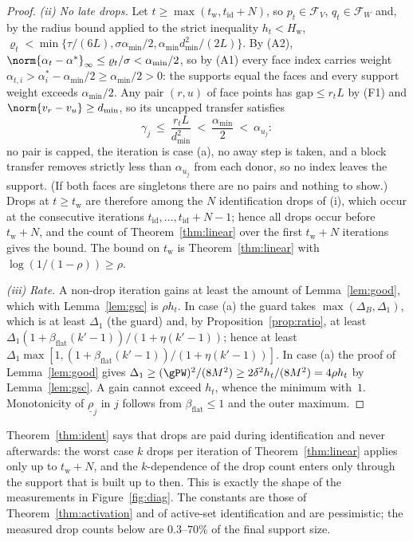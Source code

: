 \begin{proof}
\emph{(ii) No late drops.} Let $t\ge\max(t_{\mathrm w},t_{\mathrm{id}}+N)$,
so $p_t\in\mathcal F_V$, $q_t\in\mathcal F_W$ and, by the radius bound
applied to the strict inequality $h_t<H_{\mathrm w}$,
$\varrho_t<\min\{\tau/(6L),\sigma\alpha_{\min}/2,\alpha_{\min}d_{\min}^2/(2L)\}$.
By (A2), $\norm{\alpha_t-\alpha^*}_\infty\le \varrho_t/\sigma<\alpha_{\min}/2$,
so by (A1) every face index carries weight
$\alpha_{t,i}>\alpha^*_i-\alpha_{\min}/2\ge\alpha_{\min}/2>0$: the
supports equal the faces and every support weight exceeds
$\alpha_{\min}/2$. Any pair $(r,u)$ of face points has
$\mathrm{gap}\le r_tL$ by (F1) and $\norm{v_r-v_u}\ge d_{\min}$, so its
uncapped transfer satisfies
\[
\gamma_j\ \le\ \frac{r_tL}{d_{\min}^2}\ <\ \frac{\alpha_{\min}}2\ <\ \alpha_{u_j}:
\]
no pair is capped, the iteration is case (a), no away step is taken,
and a block transfer removes strictly less than $\alpha_{u_j}$ from each
donor, so no index leaves the support. (If both faces are singletons
there are no pairs and nothing to show.) Drops at $t\ge t_{\mathrm w}$ are therefore among the
$N$ identification drops of (i), which occur at the consecutive iterations
$t_{\mathrm{id}},\dots,t_{\mathrm{id}}+N-1$; hence all drops occur before
$t_{\mathrm w}+N$, and the count of Theorem~\ref{thm:linear} over the
first $t_{\mathrm w}+N$ iterations gives the bound. The bound on
$t_{\mathrm w}$ is Theorem~\ref{thm:linear} with
$\log(1/(1-\rho))\ge\rho$.

\emph{(iii) Rate.} A non-drop iteration gains at least the amount of
Lemma~\ref{lem:good}, which with Lemma~\ref{lem:gsc} is $\rho h_t$. In
case (a) the guard takes $\max(\Delta_B,\Delta_1)$, which is at least
$\Delta_1$ (the guard) and, by Proposition~\ref{prop:ratio}, at least
$\Delta_1(1+\beta_{\mathrm{flat}}(k'-1))/(1+\eta(k'-1))$; hence at least
$\Delta_1\max[1,(1+\beta_{\mathrm{flat}}(k'-1))/(1+\eta(k'-1))]$. In case
(a) the proof of Lemma~\ref{lem:good} gives
$\Delta_1\ge(\gPW)^2/(8M^2)\ge2\delta^2h_t/(8M^2)=4\rho h_t$ by
Lemma~\ref{lem:gsc}. A gain cannot exceed $h_t$, whence the minimum
with~$1$. Monotonicity of $\underline\rho_j$ in $j$ follows from
$\beta_{\mathrm{flat}}\le1$ and the outer maximum.
\end{proof}

Theorem~\ref{thm:ident} says that drops are paid during identification
and never afterwards: the worst case $k$ drops per iteration of
Theorem~\ref{thm:linear} applies only up to $t_{\mathrm w}+N$, and the
$k$-dependence of the drop count enters only through the support that
is built up to then. This is exactly the shape of the measurements in
Figure~\ref{fig:diag}. The constants are those of
Theorem~\ref{thm:activation} and of active-set identification and are
pessimistic; the measured drop counts below are $0.3$--$70\%$ of the
final support size.

